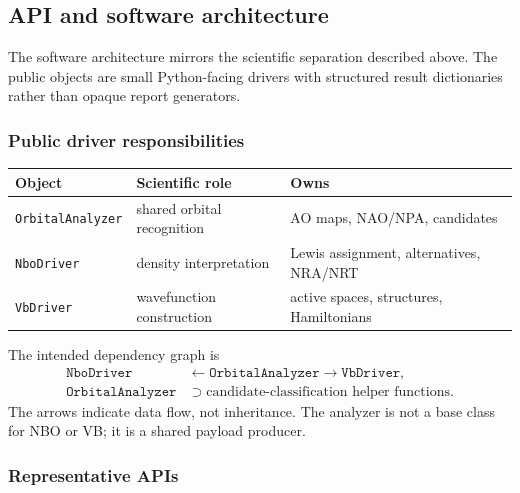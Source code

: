 \documentclass[11pt]{article}
\begin{document}
\subsection{API and software architecture}

The software architecture mirrors the scientific separation described above.  The public objects are small Python-facing drivers with structured result dictionaries rather than opaque report generators.

\subsubsection*{Public driver responsibilities}

\begin{center}
\begin{tabular}{lll}
\toprule
Object & Scientific role & Owns \\
\midrule
\texttt{OrbitalAnalyzer} & shared orbital recognition & AO maps, NAO/NPA, candidates \\
\texttt{NboDriver} & density interpretation & Lewis assignment, alternatives, NRA/NRT \\
\texttt{VbDriver} & wavefunction construction & active spaces, structures, Hamiltonians \\
\bottomrule
\end{tabular}
\end{center}

The intended dependency graph is
\begin{equation}
\begin{aligned}
	\texttt{NboDriver} &\leftarrow \texttt{OrbitalAnalyzer} \rightarrow \texttt{VbDriver}, \\
	\texttt{OrbitalAnalyzer} &\supset \text{candidate-classification helper functions}.
\end{aligned}
\end{equation}
The arrows indicate data flow, not inheritance.  The analyzer is not a base class for NBO or VB; it is a shared payload producer.

\subsubsection*{Representative APIs}
\end{document}
